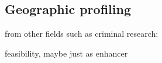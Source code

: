 
\subsection{Geographic profiling}

\begin{todos}
    \item {}
    \item {}
    \item from other fields such as criminal research: \\ 
    \item feasibility, maybe just as enhancer
\end{todos}
